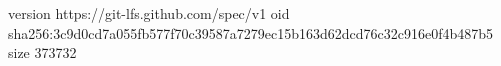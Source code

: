 version https://git-lfs.github.com/spec/v1
oid sha256:3c9d0cd7a055fb577f70c39587a7279ec15b163d62dcd76c32c916e0f4b487b5
size 373732
